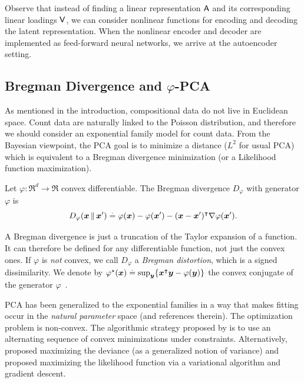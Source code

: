 \documentclass{article}
\begin{document}
Observe that instead of finding a linear representation $\mathsf{A}$ and its corresponding
linear loadings $\mathsf{V}$, we can consider nonlinear functions for encoding and decoding
the latent representation. When the nonlinear encoder and decoder are implemented as
feed-forward neural networks, we arrive at the autoencoder setting.

\subsection{Bregman Divergence and $\varphi$-PCA}

As mentioned in the introduction, compositional data do not live in Euclidean space.
Count data are naturally linked to the Poisson distribution,
and therefore we should consider an exponential family model for count data.
From the Bayesian viewpoint,
the PCA goal is to minimize a distance ($L^2$ for usual PCA) which is equivalent
to a Bregman divergence minimization (or a Likelihood function maximization).

\begin{definition}\label{defBREG}
Let $\varphi : \Re^{d} \rightarrow \Re$
convex differentiable. The Bregman divergence $D_\varphi$ with
generator $\varphi$ is
\begin{equation}
D_\varphi(\bm{x}\,\Vert\,\bm{x}') \stackrel{\mathrm{.}}{=} \varphi(\bm{x}) -
\varphi(\bm{x}') - (\bm{x}-\bm{x}')^\intercal\nabla\varphi(\bm{x}').
\end{equation}
\end{definition}
A Bregman divergence is just a truncation of the Taylor expansion of a
function. It can therefore be defined for any differentiable function,
not just the convex ones. If $\varphi$ is \textit{not} convex, we
call $D_\varphi$ a \textit{Bregman distortion}, which is a signed dissimilarity.
We denote by
$\varphi^\star(\bm{x}) \stackrel{\mathrm{.}}{=} \sup_{\bm{y}} \{\bm{x}^\intercal \bm{y} - \varphi(\bm{y})\}$
the convex conjugate of the generator $\varphi$~\cite{bvCO}.

PCA has been generalized to the exponential families in a way that
makes fitting occur in the \textit{natural parameter} space \cite{cdsAG,lGPCA}
(and references therein).
The optimization problem is non-convex.
The algorithmic strategy proposed by \cite{cdsAG} is to use
an alternating sequence of convex minimizations under constraints.
Alternatively, \cite{lGPCA} proposed maximizing the deviance (as a generalized notion of variance) and \cite{cmrVI} proposed
maximizing the likelihood function via a variational algorithm and gradient descent.
\end{document}
